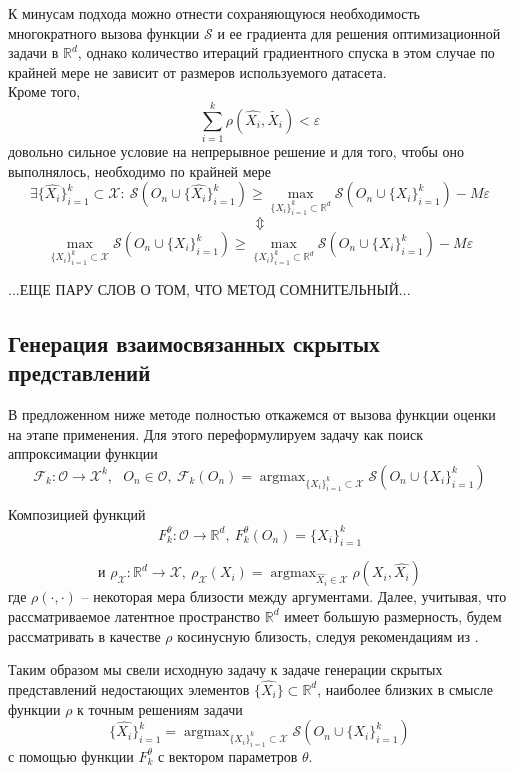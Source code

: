 \documentclass[a4paper,12pt]{article}
\DeclareMathOperator*{\argmax}{argmax}
\begin{document}
			К минусам подхода можно отнести сохраняющуюся необходимость многократного вызова функции $\mathcal{S}$ и ее градиента для решения оптимизационной задачи в $\mathbb{R}^d$, однако количество итераций градиентного спуска в этом случае по крайней мере не зависит от размеров используемого датасета.\\
			Кроме того, 
			$$\sum_{i=1}^k\rho(\hat{X_i}, \tilde{X_i}) < \varepsilon$$
			довольно сильное условие на непрерывное решение и для того, чтобы оно выполнялось, необходимо по крайней мере
			$$\exists \{\hat{X_i}\}_{i=1}^k\subset\mathcal{X}:~ \mathcal{S}\left(O_n\cup\{\hat{X_i}\}_{i=1}^k\right) \geqslant \max_{\{X_i\}_{i=1}^k\subset\mathbb{R}^d} \mathcal{S}\left(O_n\cup\{X_i\}_{i=1}^k\right) - M\varepsilon$$
			$$\Updownarrow$$
			$$\max_{\{X_i\}_{i=1}^k\subset\mathcal{X}} \mathcal{S}\left(O_n\cup\{X_i\}_{i=1}^k\right) \geqslant \max_{\{X_i\}_{i=1}^k\subset\mathbb{R}^d} \mathcal{S}\left(O_n\cup\{X_i\}_{i=1}^k\right) - M\varepsilon$$
			
			...ЕЩЕ ПАРУ СЛОВ О ТОМ, ЧТО МЕТОД СОМНИТЕЛЬНЫЙ...
						
			\subsection{Генерация взаимосвязанных скрытых представлений}		
			В предложенном ниже методе полностью откажемся от вызова функции оценки на этапе применения. Для этого переформулируем задачу как поиск аппроксимации функции 
			$$\mathcal{F}_k: \mathcal{O}\longrightarrow \mathcal{X}^k, ~~~O_n\in \mathcal{O},~ \mathcal{F}_k(O_n) = \argmax_{\{X_i\}_{i=1}^k\subset\mathcal{X}} \mathcal{S}\left(O_n\cup\{X_i\}_{i=1}^k\right)$$
			
			Композицией функций 
			$$F_k^\theta: \mathcal{O}\longrightarrow \mathbb{R}^d, ~F_k^\theta(O_n) = \{X_i\}_{i=1}^k$$
			
			 $$\text{и }\rho_\mathcal{X}: \mathbb{R}^d\longrightarrow \mathcal{X}, ~ \rho_\mathcal{X}(X_i) = \argmax_{\hat{X_i}\in\mathcal{X}}\rho(X_i, \hat{X_i})$$
			 где $\rho(\cdot, \cdot)$ -- некоторая мера близости между аргументами. Далее, учитывая, что рассматриваемое латентное пространство $\mathbb{R}^d$ имеет большую размерность, будем рассматривать в качестве $\rho$ косинусную близость, следуя рекомендациям из \cite{shirkhorshidi2015comparison}.
			 
			 			
			Таким образом мы свели исходную задачу к задаче генерации скрытых представлений недостающих элементов $\{\hat{X_i}\}\subset \mathbb{R}^d$, наиболее близких в смысле функции $\rho$ к точным решениям задачи
			$$\{\hat{X_i}\}_{i=1}^k= \argmax_{\{X_i\}_{i=1}^k\subset\mathcal{X}} \mathcal{S}\left(O_n\cup\{X_i\}_{i=1}^k\right)$$
			с помощью функции  $F_k^\theta$ с вектором параметров $\theta$. 
			
\end{document}
